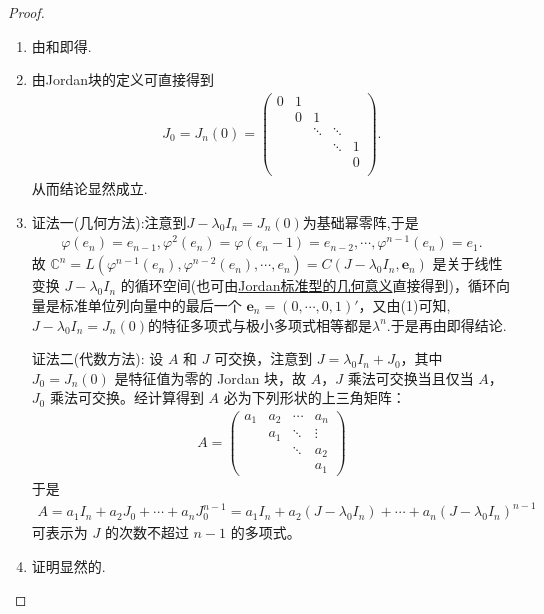 \documentclass[../../main.tex]{subfiles}
\begin{document}
\begin{proof}
\begin{enumerate}[(1)]
\item 由和即得.

\item 由Jordan块的定义可直接得到
\begin{align*}
J_0=J_n(0)=\left( \begin{matrix}
0&		1&		&		&		\\
&		0&		1&		&		\\
&		&		\ddots&		\ddots&		\\
&		&		&		\ddots&		1\\
&		&		&		&		0\\
\end{matrix} \right) .
\end{align*}
从而结论显然成立.

\item {\color{blue}证法一(几何方法):}注意到$J-\lambda_0I_n=J_n(0)$为基础幂零阵,于是
\begin{align*}
\varphi(e_n)=e_{n-1},\varphi^2(e_n)=\varphi(e_n-1)=e_{n-2},\cdots,\varphi^{n-1}(e_n)=e_1.
\end{align*}
故
$\mathbb{C}^n =L(\varphi^{n-1}(e_n),\varphi^{n-2}(e_n),\cdots,e_n)=C(J - \lambda_0I_n, \boldsymbol{e}_n)$ 是关于线性变换 $J - \lambda_0I_n$ 的循环空间(也可由\hyperref[theorem:Jordan标准型的几何意义]{Jordan标准型的几何意义}直接得到)，循环向量是标准单位列向量中的最后一个 $\boldsymbol{e}_n = (0, \cdots, 0, 1)'$，又由(1)可知,$J-\lambda_0I_n=J_n(0)$的特征多项式与极小多项式相等都是$\lambda^n$.于是再由即得结论.

{\color{blue}证法二(代数方法):}
设 $A$ 和 $J$ 可交换，注意到 $J = \lambda_0I_n + J_0$，其中 $J_0 = J_n(0)$ 是特征值为零的 Jordan 块，故 $A$，$J$ 乘法可交换当且仅当 $A$，$J_0$ 乘法可交换。经计算得到 $A$ 必为下列形状的上三角矩阵：
\begin{align*}
A = \begin{pmatrix}
a_1 & a_2 & \cdots & a_n \\
& a_1 & \ddots & \vdots \\
& & \ddots & a_2 \\
& & & a_1
\end{pmatrix}
\end{align*}
于是
\begin{align*}
A = a_1I_n + a_2J_0 + \cdots + a_nJ_0^{n - 1} = a_1I_n + a_2(J - \lambda_0I_n) + \cdots + a_n(J - \lambda_0I_n)^{n - 1}
\end{align*}
可表示为 $J$ 的次数不超过 $n - 1$ 的多项式。 

\item 证明显然的.
\end{enumerate}
\end{proof}
\end{document}
